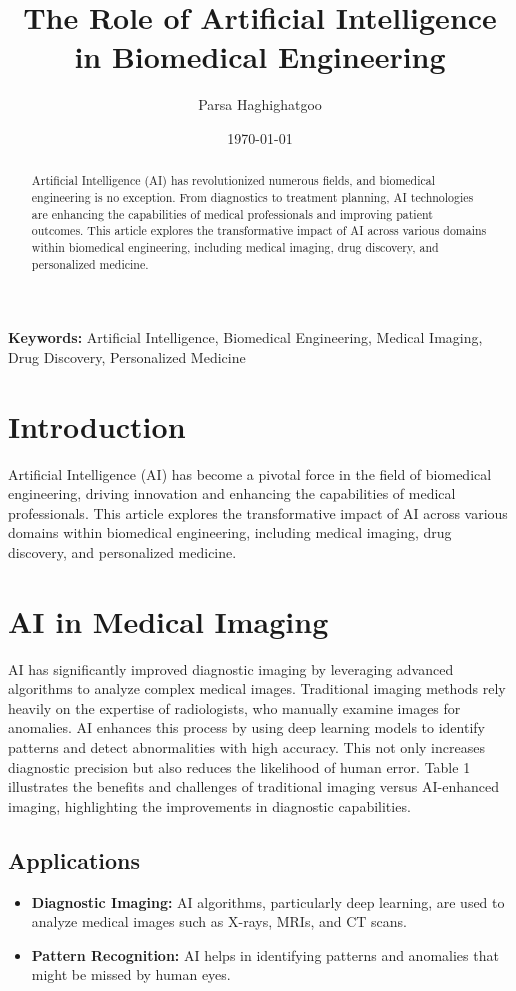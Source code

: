 \documentclass[12pt, a4paper]{article}
\title{The Role of Artificial Intelligence in Biomedical Engineering}
\author[1]{Parsa Haghighatgoo}
\affil[1]{Department of Computer Science and Engineering, Shiraz University}
\date{\today}
\begin{document}
\maketitle

\begin{abstract}
Artificial Intelligence (AI) has revolutionized numerous fields, and biomedical engineering is no exception. From diagnostics to treatment planning, AI technologies are enhancing the capabilities of medical professionals and improving patient outcomes. This article explores the transformative impact of AI across various domains within biomedical engineering, including medical imaging, drug discovery, and personalized medicine.
\end{abstract}
\textbf{Keywords:} Artificial Intelligence, Biomedical Engineering, Medical Imaging, Drug Discovery, Personalized Medicine


\section{Introduction}
Artificial Intelligence (AI) has become a pivotal force in the field of biomedical engineering, driving innovation and enhancing the capabilities of medical professionals. This article explores the transformative impact of AI across various domains within biomedical engineering, including medical imaging, drug discovery, and personalized medicine.

\section{AI in Medical Imaging}
AI has significantly improved diagnostic imaging by leveraging advanced algorithms to analyze complex medical images. Traditional imaging methods rely heavily on the expertise of radiologists, who manually examine images for anomalies. AI enhances this process by using deep learning models to identify patterns and detect abnormalities with high accuracy. This not only increases diagnostic precision but also reduces the likelihood of human error. Table 1 illustrates the benefits and challenges of traditional imaging versus AI-enhanced imaging, highlighting the improvements in diagnostic capabilities.
\subsection{Applications}
\begin{itemize}
    \item \textbf{Diagnostic Imaging:} AI algorithms, particularly deep learning, are used to analyze medical images such as X-rays, MRIs, and CT scans.
    \item \textbf{Pattern Recognition:} AI helps in identifying patterns and anomalies that might be missed by human eyes.
\end{itemize}
\end{document}
